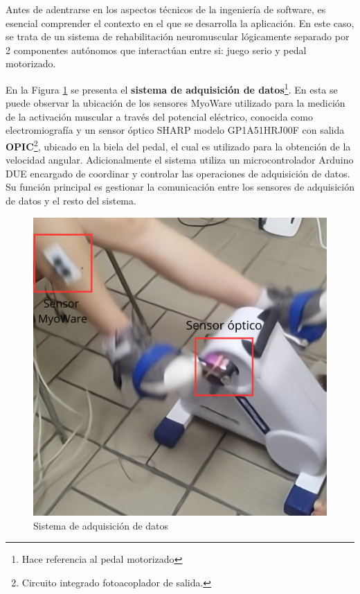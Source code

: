 Antes de adentrarse en los aspectos técnicos de la ingeniería de software, es esencial comprender el contexto en el que se desarrolla la aplicación. En este caso, se trata de un sistema de rehabilitación neuromuscular lógicamente separado por 2 componentes autónomos que interactúan entre si: juego serio y pedal motorizado. 

En la Figura \ref{fig: sa} se presenta el \textbf{sistema de adquisición de datos}\footnote{Hace referencia al pedal motorizado}. En esta se puede observar la ubicación de los sensores MyoWare  utilizado para la medición de la activación muscular a través del potencial eléctrico, conocida como electromiografía y un sensor óptico SHARP modelo GP1A51HRJ00F con salida  \textbf{OPIC}\footnote{Circuito integrado fotoacoplador de salida.}, ubicado en la biela del pedal, el cual es utilizado para la obtención de la velocidad angular. Adicionalmente el sistema utiliza un microcontrolador Arduino DUE encargado de coordinar y controlar las operaciones de adquisición de datos. Su función principal es gestionar la comunicación entre los sensores de adquisición de datos y el resto del sistema.

\begin{figure}[ht]
    \centering
    \includegraphics[scale=0.25]{images/sa.png}
    \caption{Sistema de adquisición de datos}
    \label{fig: sa}
\end{figure}    

